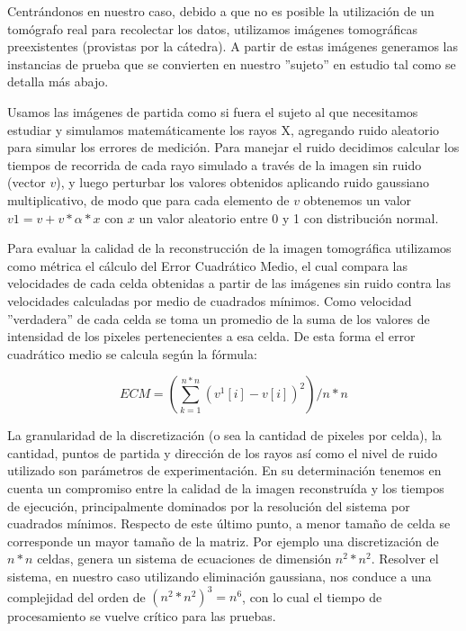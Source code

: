 \par Centrándonos en nuestro caso, debido a que no es posible la utilización de un tomógrafo real para recolectar los datos, utilizamos imágenes tomográficas preexistentes (provistas por la cátedra). A partir de estas imágenes generamos las instancias de prueba que se convierten en nuestro ''sujeto'' en estudio tal como se detalla más abajo.

\par Usamos las imágenes de partida como si fuera el sujeto al que necesitamos estudiar y simulamos matemáticamente los rayos X, agregando ruido aleatorio para simular los errores de medición. Para manejar el ruido decidimos calcular los tiempos de recorrida de cada rayo simulado a través de la imagen sin ruido (vector $v$), y luego perturbar los valores obtenidos aplicando ruido gaussiano multiplicativo, de modo que para cada elemento de $v$ obtenemos un valor $v{1}= v + v * \alpha * x$ con $x$ un valor aleatorio entre 0 y 1 con distribución normal.

\par Para evaluar la calidad de la reconstrucción de la imagen tomográfica utilizamos como métrica el cálculo del Error Cuadrático Medio, el cual compara las velocidades de cada celda obtenidas a partir de las imágenes sin ruido contra las velocidades calculadas por medio de cuadrados mínimos. Como velocidad ''verdadera'' de cada celda se toma un promedio de la suma de los valores de intensidad de los pixeles pertenecientes a esa celda. De esta forma el error cuadrático medio se calcula según la fórmula:

\begin{displaymath}
ECM =(\sum_{k=1}^{n*n} (v^{1}[i] - v[i])^{2})/n*n
\end{displaymath}


\par La granularidad de la discretización (o sea la cantidad de pixeles por celda), la cantidad, puntos de partida y dirección de los rayos así como el nivel de ruido utilizado son parámetros de experimentación. En su determinación tenemos en cuenta un compromiso entre la calidad de la imagen reconstruída y los tiempos de ejecución, principalmente dominados por la resolución del sistema por cuadrados mínimos. Respecto de este último punto, a menor tamaño de celda se corresponde un mayor tamaño de la matriz. Por ejemplo una discretización de $n*n$ celdas, genera un sistema de ecuaciones de dimensión $n^{2}*n^{2}$. Resolver el sistema, en  nuestro caso utilizando eliminación gaussiana, nos conduce a una complejidad del orden de $(n^{2}*n^{2})^3 = n^{6}$, con lo cual el tiempo de procesamiento se vuelve crítico para las pruebas.
